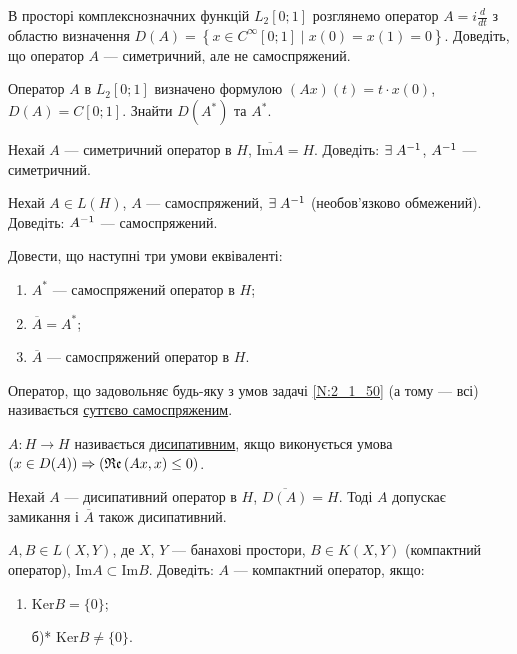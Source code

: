 \begin{exercise}
    В просторі комплекснозначних функцій $L_2[0;1]$ розглянемо оператор $A = i \frac{d}{dt}$
    з областю визначення
    $D(A) = \left\{
        x \in C^\infty[0;1] \mid x(0) = x(1) = 0
    \right\}.$
    Доведіть, що оператор $A$ --- симетричний, але не самоспряжений.
\end{exercise}

\begin{exercise}
    Оператор $A$ в $L_2[0;1]$ визначено формулою $(Ax)(t) = t \cdot x(0)$, $D(A) = C[0;1]$.
    Знайти $D(A^*)$ та $A^*$.
\end{exercise}

\begin{exercise}
    Нехай $A$ --- симетричний оператор в $H$, $\overline{\mathrm{Im}A} = H$.
    Доведіть: $\exists \; A^{-1}$, $A^{-1}$ --- симетричний.
\end{exercise}

\begin{exercise}
    Нехай $A \in L(H)$, $A$ --- самоспряжений, $\exists \; A^{-1}$ (необов'язково обмежений).
    Доведіть: $A^{-1}$ --- самоспряжений.
\end{exercise}

\begin{exercise}\label{N:2_1_50}
    Довести, що наступні три умови еквіваленті:
    \begin{enumerate}
        \item $A^*$ --- самоспряжений оператор в $H$;
        \item $\overline{A} = A^*$;
        \item $\overline{A}$ --- самоспряжений оператор в $H$.
    \end{enumerate}
\end{exercise}

\begin{theory}
    Оператор, що задовольняє будь-яку з умов задачі \ref{N:2_1_50} (а тому --- всі) називається
    \ul{суттєво самоспряженим}.

     $A: H \to H$ називається \ul{дисипативним}, якщо виконується умова
    $(x \in D(A)) \Rightarrow (\mathfrak{Re}\left(Ax, x\right) \leq 0)$.
\end{theory}

\begin{exercise}
    Нехай $A$ --- дисипативний оператор в $H$, $\overline{D(A)} = H$.
    Тоді $A$ допускає замикання і $\overline{A}$ також дисипативний.
\end{exercise}

\begin{exercise}
    $A,B \in L(X,Y)$, де $X$, $Y$ --- банахові простори, $B \in K(X,Y)$ (компактний оператор),
    $\mathrm{Im} A \subset \mathrm{Im} B$. Доведіть: $A$ --- компактний оператор, якщо:
    \begin{enumerate}
        \item $\mathrm{Ker} B = \{0\}$;
        \item[б)*] $\mathrm{Ker} B \neq \{0\} $.
    \end{enumerate}    
\end{exercise}